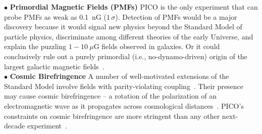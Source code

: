 \documentclass[PICOAPC.tex]{subfiles}
\begin{document}
%
$\bullet$ {\bf Primordial Magnetic Fields (PMFs)} \hspace{0.1in} PICO is the only experiment that can probe PMFs as weak as 0.1~nG ($1\,\sigma$).  Detection of PMFs would be a major discovery because it would signal new physics beyond the Standard Model of particle physics, discriminate among different theories of the early Universe, and explain the puzzling $1 - 10~\mu$G fields observed in galaxies.  Or it could conclusively rule out a purely primordial (i.e., no-dynamo-driven) origin of the largest galactic magnetic fields~\citep{Widrow:2002ud,Widrow:2011hs,Athreya:1998,Grasso:2000wj,Vachaspati:1991nm,Turner:1987bw,Ratra:1991bn,DiazGil:2007dy,Barnaby:2012tk,Long:2013tha,Durrer:2013pga}. \\
%
$\bullet$ {\bf Cosmic Birefringence} \hspace{0.1in}
A number of well-motivated extensions of the Standard Model involve fields with parity-violating coupling~\citep{Freese:1990rb,Frieman:1995pm,Carroll:1998zi,Kaloper:2005aj,2008PhRvL.101n1101C,Gluscevic:2010vv}. Their presence may cause cosmic birefringence -- a rotation of the polarization of an electromagnetic wave as it propagates across cosmological distances~\cite{Harari:1992ea,Carroll:1989vb,Carroll:1998zi}. PICO's constraints on cosmic birefringence are more stringent than any other next-decade experiment~\cite{pogosian_2019}. 
\end{document}

